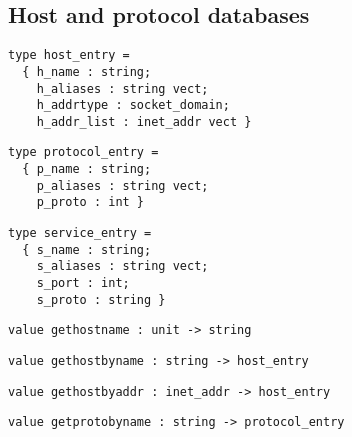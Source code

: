 \subsection*{Host and protocol databases }\begin{verbatim}
type host_entry =
  { h_name : string;
    h_aliases : string vect;
    h_addrtype : socket_domain;
    h_addr_list : inet_addr vect }
\end{verbatim}
\begin{comment}
 Structure of entries in the \verbhosts database. 
\end{comment}
\begin{verbatim}
type protocol_entry =
  { p_name : string;
    p_aliases : string vect;
    p_proto : int }
\end{verbatim}
\begin{comment}
 Structure of entries in the \verbprotocols database. 
\end{comment}
\begin{verbatim}
type service_entry =
  { s_name : string;
    s_aliases : string vect;
    s_port : int;
    s_proto : string }
\end{verbatim}
\begin{comment}
 Structure of entries in the \verbservices database. 
\end{comment}
\begin{verbatim}
value gethostname : unit -> string
\end{verbatim}
%
\begin{comment}
 Return the name of the local host. 
\end{comment}
\begin{verbatim}
value gethostbyname : string -> host_entry
\end{verbatim}
%
\begin{comment}
 Find an entry in \verbhosts with the given name, or raise
           \verbNot_found. 
\end{comment}
\begin{verbatim}
value gethostbyaddr : inet_addr -> host_entry
\end{verbatim}
%
\begin{comment}
 Find an entry in \verbhosts with the given address, or raise
           \verbNot_found. 
\end{comment}
\begin{verbatim}
value getprotobyname : string -> protocol_entry
\end{verbatim}
